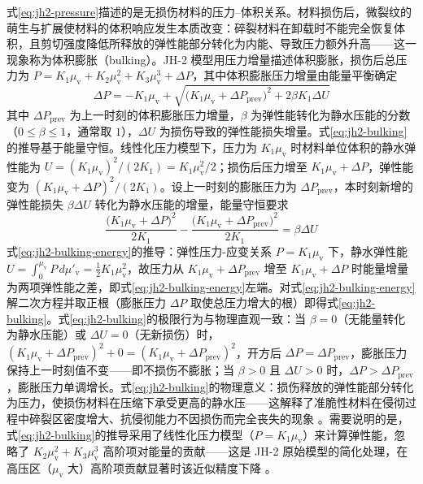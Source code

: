 式\eqref{eq:jh2-pressure}描述的是无损伤材料的压力--体积关系。材料损伤后，微裂纹的萌生与扩展使材料的体积响应发生本质改变：碎裂材料在卸载时不能完全恢复体积，且剪切强度降低所释放的弹性能部分转化为内能、导致压力额外升高——这一现象称为体积膨胀（bulking）。JH-2 模型用压力增量描述体积膨胀，损伤后总压力为 $P=K_{1}\mu_{\mathrm{v}}+K_{2}\mu_{\mathrm{v}}^{2}+K_{3}\mu_{\mathrm{v}}^{3}+\Delta P$，其中体积膨胀压力增量由能量平衡确定
\begin{equation}
  \Delta P
  =-K_{1}\mu_{\mathrm{v}}
  +\sqrt{\bigl(K_{1}\mu_{\mathrm{v}}+\Delta P_{\mathrm{prev}}\bigr)^{2}+2\beta K_{1}\Delta U}
  \label{eq:jh2-bulking}
\end{equation}
其中 $\Delta P_{\mathrm{prev}}$ 为上一时刻的体积膨胀压力增量，$\beta$ 为弹性能转化为静水压能的分数（$0\le\beta\le1$，通常取 $1$），$\Delta U$ 为损伤导致的弹性能损失增量。式\eqref{eq:jh2-bulking}的推导基于能量守恒。线性化压力模型下，压力为 $K_{1}\mu_{\mathrm{v}}$ 时材料单位体积的静水弹性能为 $U=(K_{1}\mu_{\mathrm{v}})^{2}/(2K_{1})=K_{1}\mu_{\mathrm{v}}^{2}/2$；损伤后压力增至 $K_{1}\mu_{\mathrm{v}}+\Delta P$，弹性能变为 $(K_{1}\mu_{\mathrm{v}}+\Delta P)^{2}/(2K_{1})$。设上一时刻的膨胀压力为 $\Delta P_{\mathrm{prev}}$，本时刻新增的弹性能损失 $\beta\Delta U$ 转化为静水压能的增量，能量守恒要求
\begin{equation}
  \frac{\bigl(K_{1}\mu_{\mathrm{v}}+\Delta P\bigr)^{2}}{2K_{1}}
  -\frac{\bigl(K_{1}\mu_{\mathrm{v}}+\Delta P_{\mathrm{prev}}\bigr)^{2}}{2K_{1}}
  =\beta\Delta U
  \label{eq:jh2-bulking-energy}
\end{equation}
式\eqref{eq:jh2-bulking-energy}的推导：弹性压力-应变关系 $P=K_{1}\mu_{\mathrm{v}}$ 下，静水弹性能 $U=\int_{0}^{\mu_{\mathrm{v}}}P\,d\mu'_{\mathrm{v}}=\tfrac{1}{2}K_{1}\mu_{\mathrm{v}}^{2}$，故压力从 $K_{1}\mu_{\mathrm{v}}+\Delta P_{\mathrm{prev}}$ 增至 $K_{1}\mu_{\mathrm{v}}+\Delta P$ 时能量增量为两项弹性能之差，即式\eqref{eq:jh2-bulking-energy}左端。对式\eqref{eq:jh2-bulking-energy}解二次方程并取正根（膨胀压力 $\Delta P$ 取使总压力增大的根）即得式\eqref{eq:jh2-bulking}。式\eqref{eq:jh2-bulking}的极限行为与物理直观一致：当 $\beta=0$（无能量转化为静水压能）或 $\Delta U=0$（无新损伤）时，$(K_{1}\mu_{\mathrm{v}}+\Delta P_{\mathrm{prev}})^{2}+0=(K_{1}\mu_{\mathrm{v}}+\Delta P_{\mathrm{prev}})^{2}$，开方后 $\Delta P=\Delta P_{\mathrm{prev}}$，膨胀压力保持上一时刻值不变——即不损伤不膨胀；当 $\beta>0$ 且 $\Delta U>0$ 时，$\Delta P>\Delta P_{\mathrm{prev}}$，膨胀压力单调增长。式\eqref{eq:jh2-bulking}的物理意义：损伤释放的弹性能部分转化为压力，使损伤材料在压缩下承受更高的静水压——这解释了准脆性材料在侵彻过程中碎裂区密度增大、抗侵彻能力不因损伤而完全丧失的现象 \cite{JohnsonHolmquist1999}。需要说明的是，式\eqref{eq:jh2-bulking}的推导采用了线性化压力模型（$P=K_{1}\mu_{\mathrm{v}}$）来计算弹性能，忽略了 $K_{2}\mu_{\mathrm{v}}^{2}+K_{3}\mu_{\mathrm{v}}^{3}$ 高阶项对能量的贡献——这是 JH-2 原始模型的简化处理，在高压区（$\mu_{\mathrm{v}}$ 大）高阶项贡献显著时该近似精度下降 \cite{JohnsonHolmquist1994}。

